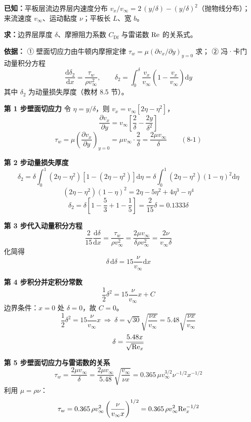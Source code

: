 \begin{jie}
\textbf{已知：}平板层流边界层内速度分布 $v_x/v_\infty=2\,(y/\delta)-(y/\delta)^{2}$（抛物线分布）；
来流速度 $v_\infty$、运动黏度 $\nu$；平板长 $L$、宽 $b$。

\textbf{求：}边界层厚度 $\delta$、摩擦阻力系数 $C_{\mathrm{Df}}$ 与雷诺数 $\mathrm{Re}$ 的关系式。

\textbf{依据：}
① 壁面切应力由牛顿内摩擦定律 $\tau_w=\mu\left(\partial v_x/\partial y\right)_{y=0}$ 求；
② 冯·卡门动量积分方程
\[ \frac{\mathrm{d}\delta_2}{\mathrm{d}x}=\frac{\tau_w}{\rho v_\infty^{2}},\qquad
\delta_2=\int_0^{\delta}\frac{v_x}{v_\infty}\left(1-\frac{v_x}{v_\infty}\right)\mathrm{d}y \]
其中 $\delta_2$ 为动量损失厚度（教材 8.5 节）。

\textbf{第 1 步\quad 壁面切应力}
令 $\eta=y/\delta$，则 $v_x=v_\infty\left[2\eta-\eta^{2}\right]$，
\[ \frac{\partial v_x}{\partial y}=v_\infty\left[\frac{2}{\delta}-\frac{2y}{\delta^{2}}\right] \]
\[ \tau_w=\mu\left(\frac{\partial v_x}{\partial y}\right)_{y=0}=\mu v_\infty\cdot\frac{2}{\delta}=\frac{2\mu v_\infty}{\delta} \qquad (8\text{-}1) \]

\textbf{第 2 步\quad 动量损失厚度}
\[ \delta_2=\delta\int_0^{1}\left(2\eta-\eta^{2}\right)\left[1-\left(2\eta-\eta^{2}\right)\right]\mathrm{d}\eta
=\delta\int_0^{1}\left(2\eta-\eta^{2}\right)(1-\eta)^{2}\mathrm{d}\eta \]
\[ \left(2\eta-\eta^{2}\right)(1-\eta)^{2}=2\eta-5\eta^{2}+4\eta^{3}-\eta^{4} \]
\[ \delta_2=\delta\left[1-\frac{5}{3}+1-\frac{1}{5}\right]=\frac{2}{15}\delta=0.1333\delta \]

\textbf{第 3 步\quad 代入动量积分方程}
\[ \frac{2}{15}\frac{\mathrm{d}\delta}{\mathrm{d}x}=\frac{\tau_w}{\rho v_\infty^{2}}
=\frac{2\mu v_\infty}{\delta\rho v_\infty^{2}}=\frac{2\nu}{v_\infty\delta} \]
化简得
\[ \delta\,\mathrm{d}\delta=15\frac{\nu}{v_\infty}\mathrm{d}x \]

\textbf{第 4 步\quad 积分并定积分常数}
\[ \frac{1}{2}\delta^{2}=15\frac{\nu}{v_\infty}x+C \]
边界条件：$x=0$ 处 $\delta=0$，故 $C=0$。
\[ \frac{1}{2}\delta^{2}=15\frac{\nu}{v_\infty}x
\ \Longrightarrow\ \delta=\sqrt{30}\sqrt{\frac{\nu x}{v_\infty}}
=5.48\sqrt{\frac{\nu x}{v_\infty}} \]
\[ \delta=\frac{5.48x}{\sqrt{\mathrm{Re}_x}} \]

\textbf{第 5 步\quad 壁面切应力与雷诺数的关系}
\[ \tau_w=\frac{2\mu v_\infty}{\delta}=\frac{2\mu v_\infty}{5.48}\sqrt{\frac{v_\infty}{\nu x}}
=0.365\,\mu v_\infty^{3/2}\nu^{-1/2}x^{-1/2} \]
利用 $\mu=\rho\nu$：
\[ \tau_w=0.365\,\rho v_\infty^{2}\left(\frac{\nu}{v_\infty x}\right)^{1/2}
=0.365\,\rho v_\infty^{2}\mathrm{Re}_x^{-1/2} \]


\end{jie}
